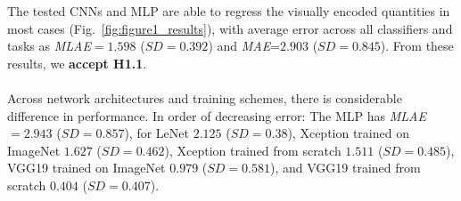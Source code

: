  The tested CNNs and MLP are able to regress the visually encoded quantities in most cases (Fig.~\ref{fig:figure1_results}), with average error across all classifiers and tasks as \textit{MLAE}$=1.598$ ($SD=0.392$) and \textit{MAE}=$2.903$ ($SD=0.845$). 
From these results, we \textbf{accept H1.1}.
\\~\\
Across network architectures and training schemes, there is considerable difference in performance. In order of decreasing error: 
The MLP has \textit{MLAE}$=2.943$ ($SD=0.857$), 
for LeNet $2.125$ ($SD=0.38$), 
Xception trained on ImageNet $1.627$ ($SD=0.462$), 
Xception trained from scratch $1.511$ ($SD=0.485$),
VGG19 trained on ImageNet $0.979$ ($SD=0.581$), 
and VGG19 trained from scratch $0.404$ ($SD=0.407$).

